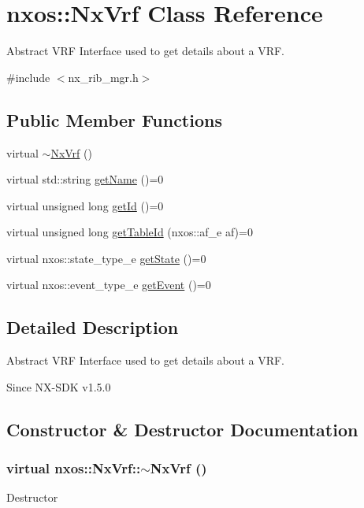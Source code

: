 \hypertarget{classnxos_1_1NxVrf}{
\section{nxos::NxVrf Class Reference}
\label{classnxos_1_1NxVrf}
}


Abstract VRF Interface used to get details about a VRF.  


{\ttfamily \#include $<$nx\_\-rib\_\-mgr.h$>$}\subsection*{Public Member Functions}
\begin{DoxyCompactItemize}
\item 
virtual \hyperlink{classnxos_1_1NxVrf_ad5f50e3424b3d78304447600a3678e0b}{$\sim$NxVrf} ()
\item 
virtual std::string \hyperlink{classnxos_1_1NxVrf_a276a8d8170f372089a5653bdd7febfde}{getName} ()=0
\item 
virtual unsigned long \hyperlink{classnxos_1_1NxVrf_a4ab30d5ff7a1d5d2abbab21652cd59fa}{getId} ()=0
\item 
virtual unsigned long \hyperlink{classnxos_1_1NxVrf_a6f1529908decf0dfb531e674440d82ed}{getTableId} (nxos::af\_\-e af)=0
\item 
virtual nxos::state\_\-type\_\-e \hyperlink{classnxos_1_1NxVrf_a443e508684e9804f14cc3526302ac8b4}{getState} ()=0
\item 
virtual nxos::event\_\-type\_\-e \hyperlink{classnxos_1_1NxVrf_a42bdba27e42981d74066a72c24809c98}{getEvent} ()=0
\end{DoxyCompactItemize}


\subsection{Detailed Description}
Abstract VRF Interface used to get details about a VRF. \begin{DoxySince}{Since}
NX-\/SDK v1.5.0 
\end{DoxySince}


\subsection{Constructor \& Destructor Documentation}
\hypertarget{classnxos_1_1NxVrf_ad5f50e3424b3d78304447600a3678e0b}{
\subsubsection[{$\sim$NxVrf}]{\setlength{\rightskip}{0pt plus 5cm}virtual nxos::NxVrf::$\sim$NxVrf ()}}
\label{classnxos_1_1NxVrf_ad5f50e3424b3d78304447600a3678e0b}
Destructor 

